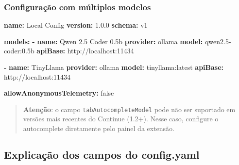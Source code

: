 \documentclass[
]{article}
\newenvironment{Shaded}{\begin{snugshade}}{\end{snugshade}}
\newcommand{\AttributeTok}[1]{\textcolor[rgb]{0.13,0.29,0.53}{#1}}
\newcommand{\CharTok}[1]{\textcolor[rgb]{0.31,0.60,0.02}{#1}}
\newcommand{\FloatTok}[1]{\textcolor[rgb]{0.00,0.00,0.81}{#1}}
\newcommand{\FunctionTok}[1]{\textcolor[rgb]{0.13,0.29,0.53}{\textbf{#1}}}
\newcommand{\KeywordTok}[1]{\textcolor[rgb]{0.13,0.29,0.53}{\textbf{#1}}}
\begin{document}
\subsubsection{Configuração com múltiplos
modelos}\label{configurauxe7uxe3o-com-muxfaltiplos-modelos}

\begin{Shaded}
\begin{Highlighting}[]
\FunctionTok{name}\KeywordTok{:}\AttributeTok{ Local Config}
\FunctionTok{version}\KeywordTok{:}\AttributeTok{ }\FloatTok{1.0.0}
\FunctionTok{schema}\KeywordTok{:}\AttributeTok{ v1}

\FunctionTok{models}\KeywordTok{:}
\AttributeTok{  }\KeywordTok{{-}}\AttributeTok{ }\FunctionTok{name}\KeywordTok{:}\AttributeTok{ Qwen 2.5 Coder 0.5b}
\AttributeTok{    }\FunctionTok{provider}\KeywordTok{:}\AttributeTok{ ollama}
\AttributeTok{    }\FunctionTok{model}\KeywordTok{:}\AttributeTok{ qwen2.5{-}coder:0.5b}
\AttributeTok{    }\FunctionTok{apiBase}\KeywordTok{:}\AttributeTok{ http://localhost:11434}

\AttributeTok{  }\KeywordTok{{-}}\AttributeTok{ }\FunctionTok{name}\KeywordTok{:}\AttributeTok{ TinyLlama}
\AttributeTok{    }\FunctionTok{provider}\KeywordTok{:}\AttributeTok{ ollama}
\AttributeTok{    }\FunctionTok{model}\KeywordTok{:}\AttributeTok{ tinyllama:latest}
\AttributeTok{    }\FunctionTok{apiBase}\KeywordTok{:}\AttributeTok{ http://localhost:11434}

\FunctionTok{allowAnonymousTelemetry}\KeywordTok{:}\AttributeTok{ }\CharTok{false}
\end{Highlighting}
\end{Shaded}

\begin{quote}
\textbf{Atenção}: o campo \texttt{tabAutocompleteModel} pode não ser
suportado em versões mais recentes do Continue (1.2+). Nesse caso,
configure o autocomplete diretamente pelo painel da extensão.
\end{quote}

\subsection{Explicação dos campos do
config.yaml}\label{explicauxe7uxe3o-dos-campos-do-config.yaml}
\end{document}
